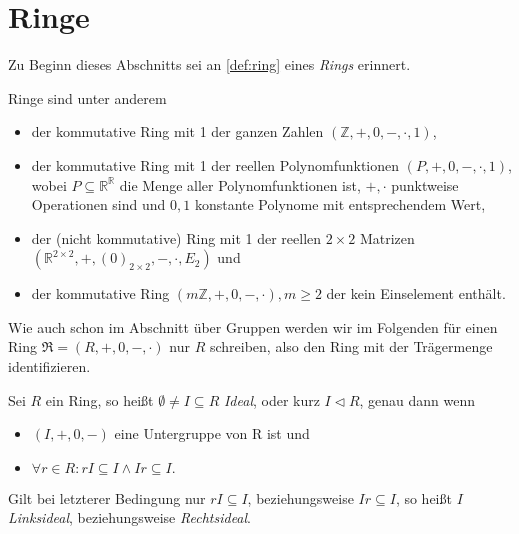 

\section{Ringe}

Zu Beginn dieses Abschnitts sei an \cref{def:ring} eines \emph{Rings} erinnert.

\begin{example} Ringe sind unter anderem
    \begin{itemize}
        \item der kommutative Ring mit 1 der ganzen Zahlen $(\mathbb{Z}, +, 0, -, \cdot, 1)$,
        \item der kommutative Ring mit 1 der reellen Polynomfunktionen $(P, +, 0, -, \cdot, 1)$, wobei $P \subseteq \mathbb{R}^\mathbb{R}$ die Menge aller Polynomfunktionen ist, $+, \cdot$ punktweise Operationen sind und $0, 1$ konstante Polynome mit entsprechendem Wert,
        \item der (nicht kommutative) Ring mit 1 der reellen $2 \times 2$ Matrizen $(\mathbb{R}^{2 \times 2}, +, (0)_{2 \times 2}, -, \cdot, E_2)$ und
        \item der kommutative Ring $(m\mathbb{Z}, +, 0, -, \cdot), m \geq 2$ der kein Einselement enthält.
    \end{itemize}
\end{example}

\begin{remark}
    Wie auch schon im Abschnitt über Gruppen werden wir im Folgenden für einen Ring $\mathfrak{R} = (R, +, 0, -, \cdot)$ nur $R$ schreiben, also den Ring mit der Trägermenge identifizieren.
\end{remark}

\begin{definition}
    Sei $R$ ein Ring, so heißt $\emptyset \neq I \subseteq R$ \emph{Ideal}, oder kurz $I \vartriangleleft R$, genau dann wenn
    \begin{itemize}
        \item $(I, +, 0, -)$ eine Untergruppe von R ist und
        \item $\forall r \in R: rI \subseteq I \land Ir \subseteq I.$
    \end{itemize}
    Gilt bei letzterer Bedingung nur $rI \subseteq I$, beziehungsweise $Ir \subseteq I$, so heißt $I$ \emph{Linksideal}, beziehungsweise \emph{Rechtsideal}.
\end{definition}

